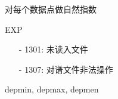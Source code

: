 \label{cmd:exp}

对每个数据点做自然指数

\begin{SACSTX}
EXP
\end{SACSTX}

\begin{itemize}
\item[-]1301: 未读入文件
\item[-]1307: 对谱文件非法操作
\end{itemize}

depmin, depmax, depmen

